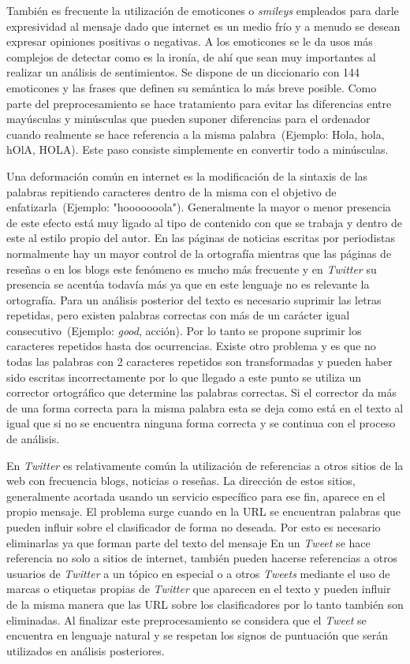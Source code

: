 También es frecuente la utilización de emoticones o \emph{smileys} empleados para darle expresividad al
mensaje dado que internet es un medio frío y a menudo se desean expresar opiniones positivas o negativas.
A los emoticones se le da usos más complejos de detectar como es la ironía, de ahí que sean muy
importantes al realizar un análisis de sentimientos. Se dispone de un diccionario con 144 emoticones y
las frases que definen su semántica lo más breve posible.
Como parte del preprocesamiento se hace tratamiento para evitar las diferencias entre mayúsculas y
minúsculas que pueden suponer diferencias para el ordenador cuando realmente se hace referencia a la
misma palabra~(Ejemplo: Hola, hola, hOlA, HOLA). Este paso consiste simplemente en convertir todo
a minúsculas.

Una deformación común en internet es la modificación de la sintaxis de las palabras repitiendo
caracteres dentro de la misma con el objetivo de enfatizarla~(Ejemplo: "hooooooola"). Generalmente
la mayor o menor presencia de este efecto está muy ligado al tipo de contenido con que se trabaja y
dentro de este al estilo propio del autor. En las páginas de noticias escritas por periodistas normalmente
hay un mayor control de la ortografía mientras que las páginas de reseñas o en los blogs este fenómeno
es mucho más frecuente y en \emph{Twitter} su presencia se acentúa todavía más ya que en este lenguaje no
es relevante la ortografía. Para un análisis posterior del texto es necesario suprimir las letras repetidas,
pero existen palabras correctas con más de un carácter igual consecutivo~(Ejemplo: \emph{good}, acción). Por
lo tanto se propone suprimir los caracteres repetidos hasta dos ocurrencias. Existe otro problema y es
que no todas las palabras con 2 caracteres repetidos son transformadas y pueden haber sido escritas
incorrectamente por lo que llegado a este punto se utiliza un corrector ortográfico que determine las
palabras correctas. Si el corrector da más de una forma correcta para la misma palabra esta se deja como
está en el texto al igual que si no se encuentra ninguna forma correcta y se continua con el proceso de
análisis.

En \emph{Twitter} es relativamente común la utilización de referencias a otros sitios de la web con frecuencia
blogs, noticias o reseñas. La dirección de estos sitios, generalmente acortada usando un servicio específico
para ese fin, aparece en el propio mensaje. El problema surge cuando en la URL se encuentran palabras
que pueden influir sobre el clasificador de forma no deseada. Por esto es necesario eliminarlas ya que
forman parte del texto del mensaje
En un \emph{Tweet} se hace referencia no solo a sitios de internet, también pueden hacerse referencias a
otros usuarios de \emph{Twitter} a un tópico en especial o a otros \emph{Tweets} mediante el uso de marcas o etiquetas
propias de \emph{Twitter} que aparecen en el texto y pueden influir de la misma manera que las URL sobre los
clasificadores por lo tanto también son eliminadas.
Al finalizar este preprocesamiento se considera que el \emph{Tweet} se encuentra en lenguaje natural y se
respetan los signos de puntuación que serán utilizados en análisis posteriores.

